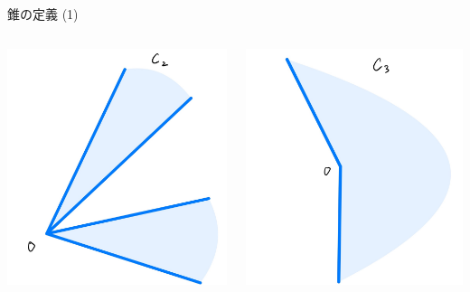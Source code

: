 \documentclass[aspectratio=169, dvipdfmx, 11pt]{beamer} %
\begin{document}
\begin{frame}{錐の定義 (1) }
\begin{columns}
\begin{column}{0.31\textwidth}
      \includegraphics[keepaspectratio, scale=0.06]{figures/cone_figure_2.jpg}
    \end{column}
    \begin{column}{0.31\textwidth}
      \includegraphics[keepaspectratio, scale=0.06]{figures/cone_figure_3.jpg}
    \end{column}
\end{columns}

\end{frame}
\end{document}
